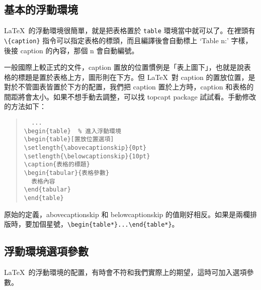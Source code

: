 \subsection{基本的浮動環境}

\LaTeX\ 的浮動環境很簡單，就是把表格置於 \texttt{table} 環境當中就可以了。在裡頭有 \verb|\{caption}| 指令可以指定表格的標頭，而且編譯後會自動標上 `Table n:' 字樣，後接 caption 的內容，那個 n 會自動編號。

一般國際上較正式的文件，caption 置放的位置慣例是「表上圖下」，也就是說表格的標題是置於表格上方，圖形則在下方。但 \LaTeX\ 對 caption 的置放位置，是對於不管圖表皆置於下方的配置，我們把 caption 置於上方時，caption 和表格的間距將會太小。如果不想手動去調整，可以找 \textsf{topcapt} package 試試看。手動修改的方法如下：

\begin{quote}
  \begin{verbatim}
  ...
\begin{table}  % 進入浮動環境
\begin{table}[置放位置選項]
\setlength{\abovecaptionskip}{0pt}
\setlength{\belowcaptionskip}{10pt}
\caption{表格的標題}
\begin{tabular}{表格參數}
  表格內容
\end{tabular}
\end{table}
\end{verbatim}
\end{quote}

原始的定義，{\ttfamily abovecaptionskip} 和 {\ttfamily belowcaptionskip} 的值剛好相反。如果是兩欄排版時，要加個星號，\verb|\begin{table*}...\end{table*}|。

\subsection{浮動環境選項參數}

\LaTeX\ 的浮動環境的配置，有時會不符和我們實際上的期望，這時可加入選項參數。

